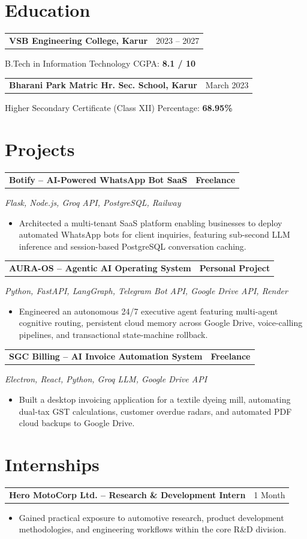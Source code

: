 \documentclass[10pt,a4paper]{article}
\makeatletter
\newcommand{\projectitem}[4]{%
    \noindent
    \begin{tabularx}{\textwidth}{@{}X r@{}}
        \textbf{\color{darktext}#1} & {\small\color{accent}\textbf{#2}}
    \end{tabularx}
    \vspace{0.5pt}

    {\small\color{graytext}\textit{#3}}\par
    \vspace{-0.5pt}

    \begin{itemize}
        \item {\small\color{graytext}#4}
    \end{itemize}
    \vspace{2.5pt}
}
\newcommand{\headingrow}[2]{%
    \noindent
    \begin{tabularx}{\textwidth}{@{}X r@{}}
        \textbf{\color{darktext}#1} & {\small\color{graytext}#2}
    \end{tabularx}\par
}
\makeatother
\begin{document}
\section{Education}

\headingrow{VSB Engineering College, Karur}{2023 -- 2027}
{\small\color{graytext}B.Tech in Information Technology \hfill CGPA: \textbf{8.1 / 10}}\par
\vspace{4pt}

\headingrow{Bharani Park Matric Hr. Sec. School, Karur}{March 2023}
{\small\color{graytext}Higher Secondary Certificate (Class XII) \hfill Percentage: \textbf{68.95\%}}\par

\section{Projects}

\projectitem
{Botify -- AI-Powered WhatsApp Bot SaaS}
{Freelance}
{Flask, Node.js, Groq API, PostgreSQL, Railway}
{Architected a multi-tenant SaaS platform enabling businesses to deploy automated WhatsApp bots for client inquiries, featuring sub-second LLM inference and session-based PostgreSQL conversation caching.}

\projectitem
{AURA-OS -- Agentic AI Operating System}
{Personal Project}
{Python, FastAPI, LangGraph, Telegram Bot API, Google Drive API, Render}
{Engineered an autonomous 24/7 executive agent featuring multi-agent cognitive routing, persistent cloud memory across Google Drive, voice-calling pipelines, and transactional state-machine rollback.}

\projectitem
{SGC Billing -- AI Invoice Automation System}
{Freelance}
{Electron, React, Python, Groq LLM, Google Drive API}
{Built a desktop invoicing application for a textile dyeing mill, automating dual-tax GST calculations, customer overdue radars, and automated PDF cloud backups to Google Drive.}

\section{Internships}

\headingrow{Hero MotoCorp Ltd. -- Research \& Development Intern}{1 Month}
\begin{itemize}
    \item {\small\color{graytext}Gained practical exposure to automotive research, product development methodologies, and engineering workflows within the core R\&D division.}
\end{itemize}
\vspace{2pt}
\end{document}
